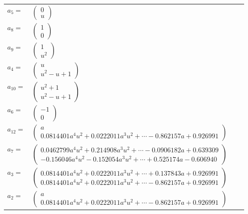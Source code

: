 \documentclass[1p]{elsarticle_modified}
\theoremstyle{definition}
\begin{document}
\begin{tabular}{m{7pt} m{180pt} m{7pt} m{180pt} }
\flushright $a_{5}=$&$\begin{pmatrix}0\\u\end{pmatrix}$ \\
\flushright $a_{8}=$&$\begin{pmatrix}1\\0\end{pmatrix}$ \\
\flushright $a_{9}=$&$\begin{pmatrix}1\\u^2\end{pmatrix}$ \\
\flushright $a_{4}=$&$\begin{pmatrix}u\\u^2- u+1\end{pmatrix}$ \\
\flushright $a_{10}=$&$\begin{pmatrix}u^2+1\\u^2- u+1\end{pmatrix}$ \\
\flushright $a_{6}=$&$\begin{pmatrix}-1\\0\end{pmatrix}$ \\
\flushright $a_{12}=$&$\begin{pmatrix}a\\0.0814401 a^{4} u^{2}+0.0222011 a^{3} u^{2}+\cdots-0.862157 a+0.926991\end{pmatrix}$ \\
\flushright $a_{7}=$&$\begin{pmatrix}0.0462799 a^{4} u^{2}+0.214908 a^{3} u^{2}+\cdots-0.0906182 a+0.639309\\-0.156046 a^{4} u^{2}-0.152054 a^{3} u^{2}+\cdots+0.525174 a-0.606940\end{pmatrix}$ \\
\flushright $a_{3}=$&$\begin{pmatrix}0.0814401 a^{4} u^{2}+0.0222011 a^{3} u^{2}+\cdots+0.137843 a+0.926991\\0.0814401 a^{4} u^{2}+0.0222011 a^{3} u^{2}+\cdots-0.862157 a+0.926991\end{pmatrix}$ \\
\flushright $a_{2}=$&$\begin{pmatrix}a\\0.0814401 a^{4} u^{2}+0.0222011 a^{3} u^{2}+\cdots-0.862157 a+0.926991\end{pmatrix}$ \\

\end{tabular}
\end{document}
